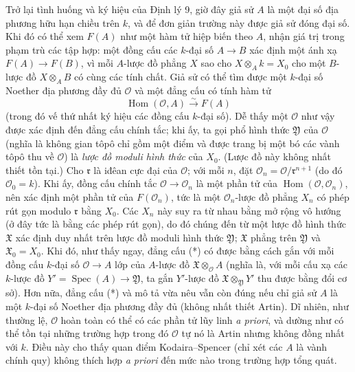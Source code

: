 \documentclass[11pt,twoside,openany]{book}
\numberwithin{equation}{section}
\newcommand{\src}[1]{%
  \phantomsection\hypertarget{src:\fgasourceid:#1}{}%
  \marginpar{\raggedleft\footnotesize\sffamily #1}%
}
\newcommand{\fgasourceid}{unset}
\begin{document}
\src{208}
Trở lại tình huống và ký hiệu của Định lý 9, giờ đây giả sử $A$ là một đại số
địa phương hữu hạn chiều trên $k$, và để đơn giản trường này được giả sử đóng đại số.
Khi đó có thể xem $F(A)$ như một hàm tử hiệp biến theo $A$, nhận giá trị trong
phạm trù các tập hợp: một đồng cấu các $k$-đại số $A\longrightarrow B$ xác
định một ánh xạ $F(A)\longrightarrow F(B)$, vì mỗi $A$-lược đồ phẳng $X$ sao
cho $X\otimes_A k=X_0$ cho một $B$-lược đồ $X\otimes_A B$ có cùng các tính
chất. Giả sử có thể tìm được một $k$-đại số Noether địa phương đầy đủ
$\mathcal O$ và một đẳng cấu có tính hàm tử
\begin{equation}
  \tag{*}
  \operatorname{Hom}(\mathcal O,A)\xrightarrow{\sim}F(A)
\end{equation}
(trong đó vế thứ nhất ký hiệu các đồng cấu $k$-đại số). Dễ thấy một
$\mathcal O$ như vậy được xác định đến đẳng cấu chính tắc; khi ấy, ta gọi phổ
hình thức $\mathfrak Y$ của $\mathcal O$ (nghĩa là không gian tôpô chỉ gồm
một điểm và được trang bị một bó các vành tôpô thu về $\mathcal O$) là
\emph{lược đồ moduli hình thức} của $X_0$. (Lược đồ này không nhất thiết tồn
tại.) Cho $\mathfrak r$ là iđêan cực đại của $\mathcal O$; với mỗi $n$, đặt
$\mathcal O_n=\mathcal O/\mathfrak r^{n+1}$ (do đó $\mathcal O_0=k$). Khi
ấy, đồng cấu chính tắc $\mathcal O\longrightarrow\mathcal O_n$ là một phần tử
của $\operatorname{Hom}(\mathcal O,\mathcal O_n)$, nên xác định một phần tử
của $F(\mathcal O_n)$, tức là một $\mathcal O_n$-lược đồ phẳng $X_n$ có phép
rút gọn modulo $\mathfrak r$ bằng $X_0$. Các $X_n$ này suy ra từ nhau bằng
mở rộng vô hướng (ở đây tức là bằng các phép rút gọn), do đó chúng đến từ một
lược đồ hình thức $\mathfrak X$ xác định duy nhất trên lược đồ moduli hình
thức $\mathfrak Y$; $\mathfrak X$ phẳng trên $\mathfrak Y$ và
$\mathfrak X_0=X_0$. Khi đó, như thấy ngay, đẳng cấu (*) có được bằng cách
gắn với mỗi đồng cấu $k$-đại số $\mathcal O\longrightarrow A$ lớp của
$A$-lược đồ $\mathfrak X\otimes_{\mathcal O}A$ (nghĩa là, với mỗi cấu xạ các
$k$-lược đồ $Y'=\operatorname{Spec}(A)\longrightarrow\mathfrak Y$, ta gắn
$Y'$-lược đồ $\mathfrak X\otimes_{\mathfrak Y}Y'$ thu được bằng đổi cơ sở).
Hơn nữa, đẳng cấu (*) và mô tả vừa nêu vẫn còn đúng nếu chỉ giả sử $A$ là một
$k$-đại số Noether địa phương đầy đủ (không nhất thiết Artin). Dĩ nhiên, như
thường lệ, $\mathcal O$ hoàn toàn có thể có các phần tử lũy linh
\textit{a priori}, và dường như có thể tồn tại những trường hợp trong đó
$\mathcal O$ tự nó là Artin nhưng không đồng nhất với $k$. Điều này cho thấy
quan điểm Kodaira--Spencer (chỉ xét các $A$ là vành chính quy) không thích hợp
\textit{a priori} đến mức nào trong trường hợp tổng quát.
\end{document}
